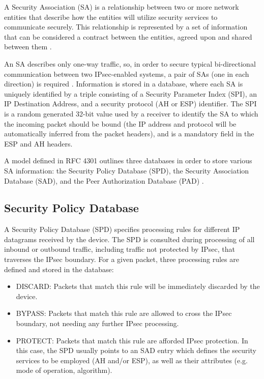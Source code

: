 \documentclass[a4paper,12pt]{report}
\begin{document}
	A Security Association (SA) is a relationship between two or more network entities that describe how the entities will utilize security services to communicate securely. This relationship is represented by a set of information that can be considered a contract between the entities, agreed upon and shared between them \cite{rfc2408}. 
	
	An SA describes only one-way traffic, so, in order to secure typical bi-directional communication between two IPsec-enabled systems, a pair of SAs (one in each direction) is required \cite{rfc4301}. Information is stored in a database, where each SA is uniquely identified by a triple consisting of a Security Parameter Index (SPI), an IP Destination Address, and a security protocol (AH or ESP) identifier. The SPI is a random generated 32-bit value used by a receiver to identify the SA to which the incoming packet should be bound (the IP address and protocol will be automatically inferred from the packet headers), and is a mandatory field in the ESP and AH headers.
	
	A model defined in RFC 4301 outlines three databases in order to store various SA information: the Security Policy Database (SPD), the Security Association Database (SAD), and the Peer Authorization Database (PAD) \cite{rfc4301}.
	
	\subsection{Security Policy Database}
		A Security Policy Database (SPD) specifies processing rules for different IP datagrams received by the device. The SPD is consulted during processing of all inbound or outbound traffic, including traffic not protected by IPsec, that traverses the IPsec boundary. For a given packet, three processing rules are defined and stored in the database:
		\begin{itemize}
			\item DISCARD: Packets that match this rule will be immediately discarded by the device.
			\item BYPASS: Packets that match this rule are allowed to cross the IPsec boundary, not needing any further IPsec processing.
			\item PROTECT: Packets that match this rule are afforded IPsec protection. In this case, the SPD usually points to an SAD entry which defines the security services to be employed (AH and/or ESP), as well as their attributes (e.g. mode of operation, algorithm).
		\end{itemize}
		
\end{document}
